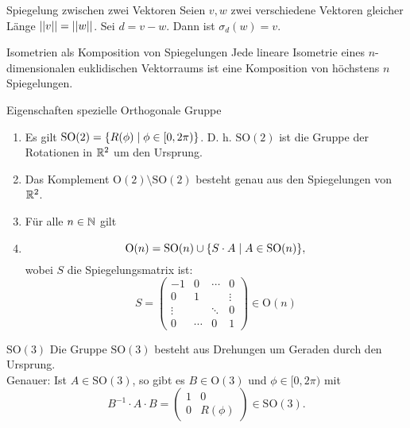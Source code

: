 \documentclass[main.tex]{subfiles}
\begin{document}
\begin{karte}{Spiegelung zwischen zwei Vektoren}
    Seien \(v,w\) zwei verschiedene Vektoren 
    gleicher Länge \( \left|\left|v\right|\right| = \left|\left|w\right|\right| \). Sei 
    \( d = v-w \). Dann ist \( \sigma_d(w) = v \).
\end{karte}

\begin{karte}{Isometrien als Komposition von Spiegelungen}
    Jede lineare Isometrie eines \(n\)-dimensionalen 
    euklidischen Vektorraums ist eine Komposition von 
    höchstens \(n\) Spiegelungen.
\end{karte}

\begin{karte}{Eigenschaften spezielle Orthogonale Gruppe}
    \begin{enumerate}
        \item Es gilt \( \mathrm{SO}(2) = \{R(\phi) \;\vert\; 
        \phi \in [0,2\pi)\} \). D. h. \( \mathrm{SO}(2) \) ist 
        die Gruppe der Rotationen in \( \mathbb{R}^2 \) um den Ursprung.
        \item Das Komplement \( \mathrm{O}(2) \setminus 
        \mathrm{SO}(2) \) besteht genau aus den Spiegelungen 
        von \(\mathbb{R}^2\).
        \item Für alle \( n\in\mathbb{N} \) gilt 
        \item \[ \mathrm{O}(n) = \mathrm{SO}(n) \cup 
        \{S\cdot A \;\vert\; A \in \mathrm{SO}(n)\}, \] 
        wobei \(S\) die Spiegelungsmatrix ist: 
        \[ S = \begin{pmatrix}
            -1 & 0 &\cdots & 0 \\
            0 & 1 && \vdots \\
            \vdots && \ddots & 0 \\
            0 & \cdots & 0 & 1
        \end{pmatrix} \in \mathrm{O}(n) \]
    \end{enumerate}
\end{karte}

\begin{karte}{\( \mathrm{SO}(3) \)}
    Die Gruppe \( \mathrm{SO}(3) \) besteht aus 
    Drehungen um Geraden durch den Ursprung. \\
    Genauer: Ist \(A \in \mathrm{SO}(3)\), so gibt 
    es \( B\in \mathrm{O}(3) \) und 
    \( \phi \in [0,2\pi) \) mit 
    \[ B^{-1} \cdot A \cdot B = 
    \begin{pmatrix}
        1 & 0 \\ 0 & R(\phi)
    \end{pmatrix} \in \mathrm{SO}(3). \]
\end{karte}
\end{document}
